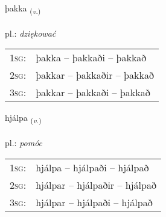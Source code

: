 \documentclass[frontgrid, backgrid]{flacards}\usepackage[]{graphicx}\usepackage[]{xcolor}
\begin{document}
\renewcommand{\flhead}{\vskip5pt \fboxsep=0pt {\small\bfseries\footnotesize Sagnorð | Verb}}
\renewcommand{\fcfoot}{\vskip5pt \fboxsep=0pt \hspace{2pt}{\small\bfseries\footnotesize 1K}}

\renewcommand{\blhead}{\vskip5pt {\small\bfseries\footnotesize Sagnorð | Verb }}
\renewcommand{\bcfoot}{\vskip5pt \hspace{2pt}{\small\bfseries\footnotesize 1K}}


{þakka \small{\textsubscript{(\textit{v.})}} \\[1ex] %
\textphonetic{[θahka]} \\
pl.: \emph{dziękować} \\  [2ex]
\renewcommand*{\arraystretch}{0.8}
\begin{tabular}{p{1cm}l}
\textsc{1sg}: & þakka -- þakkaði -- þakkað \\ 
\textsc{2sg}: & þakkar -- þakkaðir -- þakkað \\ 
\textsc{3sg}: & þakkar -- þakkaði -- þakkað \\ 
\end{tabular}
}

\renewcommand{\flhead}{\vskip5pt \fboxsep=0pt {\small\bfseries\footnotesize Sagnorð | Verb}}
\renewcommand{\fcfoot}{\vskip5pt \fboxsep=0pt \hspace{2pt}{\small\bfseries\footnotesize 1K}}

\renewcommand{\blhead}{\vskip5pt {\small\bfseries\footnotesize Sagnorð | Verb }}
\renewcommand{\bcfoot}{\vskip5pt \hspace{2pt}{\small\bfseries\footnotesize 1K}}


{hjálpa \small{\textsubscript{(\textit{v.})}} \\[1ex] %
\textphonetic{[çaul̥pa]} \\
pl.: \emph{pomóc} \\  [2ex]
\renewcommand*{\arraystretch}{0.8}
\begin{tabular}{p{1cm}l}
\textsc{1sg}: & hjálpa -- hjálpaði -- hjálpað \\ 
\textsc{2sg}: & hjálpar -- hjálpaðir -- hjálpað \\ 
\textsc{3sg}: & hjálpar -- hjálpaði -- hjálpað \\ 
\end{tabular}
}
\end{document}

